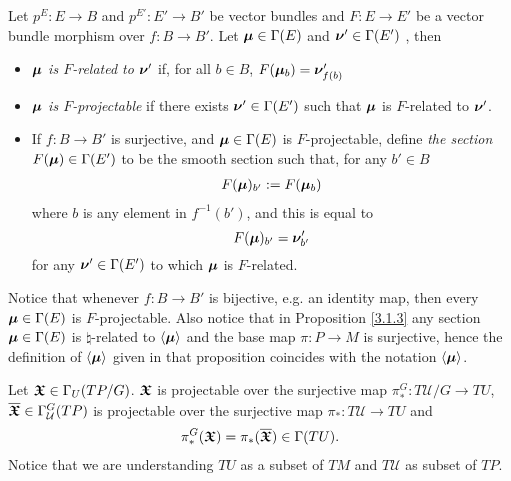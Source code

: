 \begin{definition}\label{defnRelatedProjectable}
Let $p^E:E \to B$ and $p^{E'}:E' \to B'$ be vector bundles and $F: E \to E'$ be a vector bundle morphism over $f: B \to B'$. Let $\bm{\mu} \in \Gamma(E)$ and $\bm{\nu}' \in \Gamma(E')$ , then
    \begin{itemize}
        
    \item \emph{$\bm{\mu}$ is $F$-related to $\bm{\nu}'$} if, for all $b \in B$, $F(\bm{\mu}_b) = \bm{\nu}'_{f(b)}$
    
    \item \emph{$\bm{\mu}$ is $F$-projectable} if there exists $\bm{\nu}' \in \Gamma(E')$ such that $\bm{\mu}$ is $F$-related to $\bm{\nu}'$.
    
    \item If $f:B \to B'$ is surjective, and $\bm{\mu} \in \Gamma(E)$ is $F$-projectable, define \emph{the section $F(\bm{\mu}) \in \Gamma(E')$} to be the smooth section such that, for any $b' \in B$
    \begin{align} \label{funOfSection}
        F(\bm{\mu})_{b'} := F(\bm{\mu}_b)
    \end{align} where $b$ is any element in $f^{-1}(b')$, and this is equal to \[F(\bm{\mu})_{b'} = \bm{\nu}'_{b'}\] for any $\bm{\nu}' \in \Gamma(E')$ to which $\bm{\mu}$ is $F$-related.
    
    \end{itemize}

Notice that whenever $f: B \to B'$ is bijective, e.g. an identity map, then every $\bm{\mu} \in \Gamma(E)$ is $F$-projectable. Also notice that in Proposition \ref{3.1.3} any section $\bm{\mu} \in \Gamma(E)$ is $\natural$-related to $\left\langle \bm{\mu} \right\rangle$ and the base map $\pi:P \to M$ is surjective, hence the definition of $\left\langle \bm{\mu} \right\rangle$ given in that proposition coincides with the notation $\left\langle \bm{\mu} \right\rangle$.

\end{definition}

\begin{theorem} \label{theoAnchorUpsect}
Let $\bm{\mathfrak{X}} \in \Gamma_U(TP/G)$. $\bm{\mathfrak{X}}$ is projectable over the surjective map $\pi_*^G: T\mathcal U/G \to TU$, $\overline{\bm{\bm{\mathfrak{X}}}} \in \Gamma^G_{\mathcal U}(TP)$ is projectable over the surjective map $\pi_*: T\mathcal U \to TU$ and
\begin{align} \label{theoAnchorUpsectEqn}
    \pi^G_*(\bm{\mathfrak{X}}) = \pi_*(\overline{\bm{\bm{\mathfrak{X}}}}) \in \Gamma(TU).
\end{align}
Notice that we are understanding $TU$ as a subset of $TM$ and $T\mathcal U$ as subset of $TP$.
\end{theorem}

